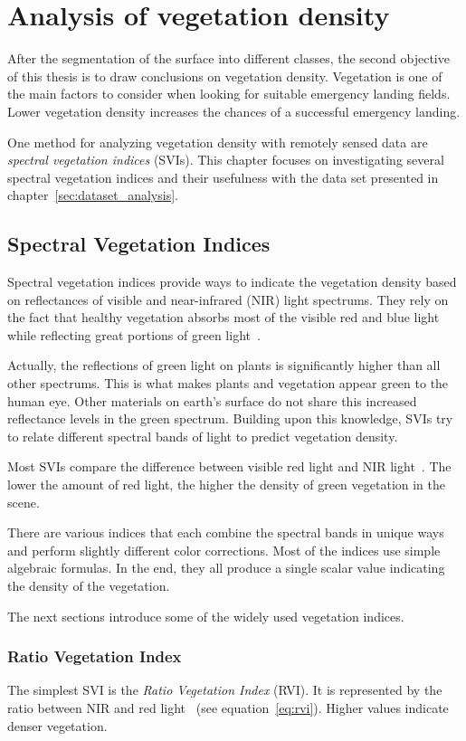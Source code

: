\section{Analysis of vegetation density}
\label{sec:vegetation_analysis}
After the segmentation of the surface into different classes, the second objective of this thesis is to draw conclusions on vegetation density. Vegetation is one of the main factors to consider when looking for suitable emergency landing fields. Lower vegetation density increases the chances of a successful emergency landing.

One method for analyzing vegetation density with remotely sensed data are \emph{spectral vegetation indices} (SVIs). This chapter focuses on investigating several spectral vegetation indices and their usefulness with the data set presented in chapter~\ref{sec:dataset_analysis}.

\subsection{Spectral Vegetation Indices}
Spectral vegetation indices provide ways to indicate the vegetation density based on reflectances of visible and near-infrared (NIR) light spectrums. They rely on the fact that healthy vegetation absorbs most of the visible red and blue light while reflecting great portions of green light~\cite{glv03}.

Actually, the reflections of green light on plants is significantly higher than all other spectrums. This is what makes plants and vegetation appear green to the human eye. Other materials on earth's surface do not share this increased reflectance levels in the green spectrum. Building upon this knowledge, SVIs try to relate different spectral bands of light to predict vegetation density.

Most SVIs compare the difference between visible red light and NIR light~\cite{glv03}. The lower the amount of red light, the higher the density of green vegetation in the scene.

There are various indices that each combine the spectral bands in unique ways and perform slightly different color corrections. Most of the indices use simple algebraic formulas. In the end, they all produce a single scalar value indicating the density of the vegetation.

The next sections introduce some of the widely used vegetation indices.

\subsubsection{Ratio Vegetation Index}
The simplest SVI is the \emph{Ratio Vegetation Index} (RVI). It is represented by the ratio between NIR and red light~\cite{glv03} (see equation~\ref{eq:rvi}). Higher values indicate denser vegetation.

